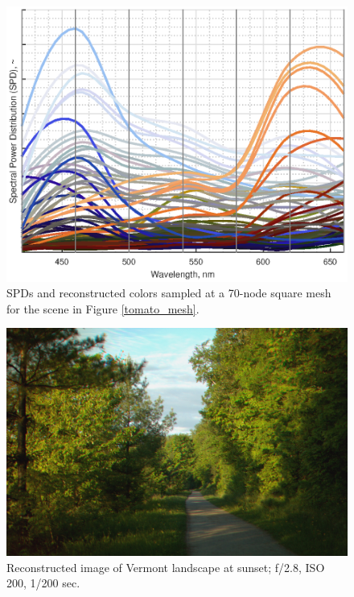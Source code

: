 \documentclass[twocolumn,10pt]{asme2ej}
\begin{document}
\begin{figure}[H]
\begin{centering}
  \includegraphics[height=0.6\linewidth]{broccoli_bottle_tomato.eps}
  \caption{SPDs and reconstructed colors sampled at a 70-node square mesh for the scene in Figure \ref{tomato_mesh}.}
  \label{tomato_SPDs}
  \end{centering}
\end{figure}

\clearpage

\begin{figure}[H]
\begin{centering}
  \includegraphics[height=0.55\linewidth]{vermont_path.jpg}
  \caption{Reconstructed image of Vermont landscape at sunset; f/2.8, ISO 200, 1/200 sec.}
  \label{path_mesh}
  \end{centering}
\end{figure}
\end{document}
